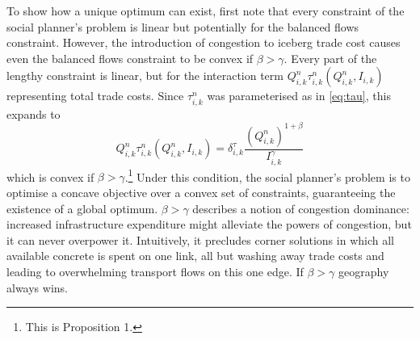 \documentclass[11pt, oneside]{article}   	%
\begin{document}
To show how a unique optimum can exist, first note that every constraint of the social planner's problem is linear but potentially for the balanced flows constraint. However, the introduction of congestion to iceberg trade cost causes even the balanced flows constraint to be convex if $\beta > \gamma$. Every part of the lengthy constraint is linear, but for the interaction term $Q_{i,k}^{n}\tau_{i,k}^{n}(Q_{i,k}^{n}, I_{i,k})$ representing total trade costs. Since $\tau_{i,k}^{n}$ was parameterised as in \eqref{eq:tau}, this expands to
\begin{equation}
  Q_{i,k}^{n}\tau_{i,k}^{n}(Q_{i,k}^{n}, I_{i,k}) = \delta^{\tau}_{i,k} \frac{(Q_{i,k}^{n})^{1+\beta}}{I_{i,k}^{\gamma}}
\end{equation}
which is convex if $\beta > \gamma$.\footnote{This is \citeauthor{fajgelbaum_optimal_2017} Proposition 1.} Under this condition, the social planner's problem is to optimise a concave objective over a convex set of constraints, guaranteeing the existence of a global optimum. $\beta > \gamma$ describes a notion of congestion dominance: increased infrastructure expenditure might alleviate the powers of congestion, but it can never overpower it. Intuitively, it precludes corner solutions in which all available concrete is spent on one link, all but washing away trade costs and leading to overwhelming transport flows on this one edge. If $\beta > \gamma$ geography always wins.
\end{document}
